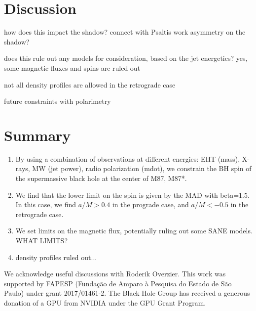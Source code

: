 \documentclass[preprint2]{aastex62}
\begin{document}





\section{Discussion} \label{sec:disc}

how does this impact the shadow?
connect with Psaltis work
asymmetry on the shadow?

does this rule out any models for consideration, based on the jet energetics?
yes, some magnetic fluxes and spins are ruled out

not all density profiles are allowed in the retrograde case

future constraints with polarimetry




\section{Summary}	\label{sec:summary}

\begin{enumerate}
\item By using a combination of observations at different energies: EHT (mass), X-rays, MW (jet power), radio polarization (mdot), we constrain the BH spin of the supermassive black hole at the center of M87, M87*. 
\item We find that the lower limit on the spin is given by the MAD with beta=1.5. In this case, we find $a/M>0.4$ in the prograde case, and $a/M<-0.5$ in the retrograde case. 
\item We set limits on the magnetic flux, potentially ruling out some SANE models. WHAT LIMITS?
\item density profiles ruled out...
\end{enumerate}






\acknowledgments

We acknowledge useful discussions with Roderik Overzier. This work was supported by FAPESP (Funda\c{c}\~ao de Amparo \`a Pesquisa do Estado de S\~ao Paulo) under grant 2017/01461-2. The Black Hole Group has received a generous donation of a GPU from NVIDIA under the GPU Grant Program.
\end{document}
